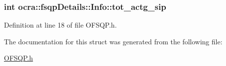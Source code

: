 \subsubsection[{\texorpdfstring{tot\+\_\+actg\+\_\+sip}{tot_actg_sip}}]{\setlength{\rightskip}{0pt plus 5cm}int ocra\+::fsqp\+Details\+::\+Info\+::tot\+\_\+actg\+\_\+sip}\hypertarget{structocra_1_1fsqpDetails_1_1Info_ae08ce33371d07fc406b18a9d7b58dabc}{}\label{structocra_1_1fsqpDetails_1_1Info_ae08ce33371d07fc406b18a9d7b58dabc}


Definition at line 18 of file O\+F\+S\+Q\+P.\+h.



The documentation for this struct was generated from the following file\+:\begin{DoxyCompactItemize}
\item 
\hyperlink{OFSQP_8h}{O\+F\+S\+Q\+P.\+h}\end{DoxyCompactItemize}

